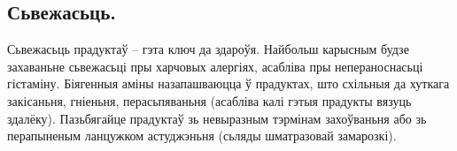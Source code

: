 \subsection{Сьвежасьць.}
Сьвежасьць прадуктаў – гэта ключ да здароўя. Найбольш карысным будзе захаваньне сьвежасьці пры харчовых алергіях, асабліва пры непераноснасьці гістаміну. Біягенныя аміны назапашваюцца ў прадуктах, што схільныя да хуткага закісаньня, гніеньня, перасьпяваньня (асабліва калі гэтыя прадукты вязуць здалёку). Пазьбягайце прадуктаў зь невыразным тэрмінам захоўваньня або зь перапыненым ланцужком астуджэньня (сьляды шматразовай замарозкі).
